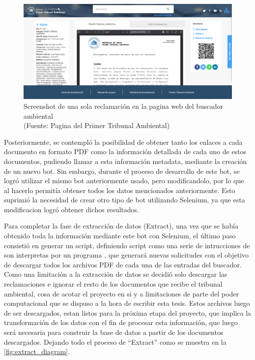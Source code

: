 \begin{figure}[ht!]
    \centering
    \includegraphics[width=.75\textwidth]{figures/huemul3.png}
    \caption[Screenshot de una sola reclamación en la pagina web del buscador ambiental]{Screenshot de una sola reclamación en la pagina web del buscador ambiental\\
    {\scriptsize (Fuente: Pagina del Primer Tribunal Ambiental)}}
    \label{fig:extract2}
\end{figure}

\newpage

Posteriormente, se contempló la posibilidad de obtener tanto los enlaces a cada documento en formato PDF como la información 
detallada de cada uno de estos documentos, pudiendo llamar a esta información metadata, mediante la creación de un nuevo bot. 
Sin embargo, durante el proceso de desarrollo de este bot, se logró utilizar el mismo bot anteriormente usado, pero modificandolo,
por lo que al hacerlo permitía obtener todos los datos mencionados anteriormente. Esto suprimió 
la necesidad de crear otro tipo de bot utilizando Selenium, ya que esta modificacion logró obtener dichos resultados.

Para completar la fase de extracción de datos (Extract), una vez que se había obtenido toda la información mediante este bot con Selenium, 
el último paso consistió en generar un script, definiendo script como una serie de intrucciones de son interpretas por un programa \cite{techtargetWhatScript}, que generará nuevas solicitudes con el objetivo de descargar todos los archivos PDF de cada una 
de las entradas del buscador. 
Como una limitación a la extracción de datos se decidió solo descargar las reclamaciones e ignorar el resto de los documentos que recibe el tribunal ambiental, cosa de acotar el proyecto en si y a limitaciones de parte del poder computacional que se dispuso a la hora de escribir esta tesis.
Estos archivos luego de ser descargados, estan listos para la próxima etapa del proyecto, que implica la transformación 
de los datos con el fin de procesar esta información, que luego será necesaria para construir la base de datos a partir de los documentos descargados.
Dejando todo el proceso de ``Extract'' como se muestra en la \autoref{fig:extract_diagram}. 

